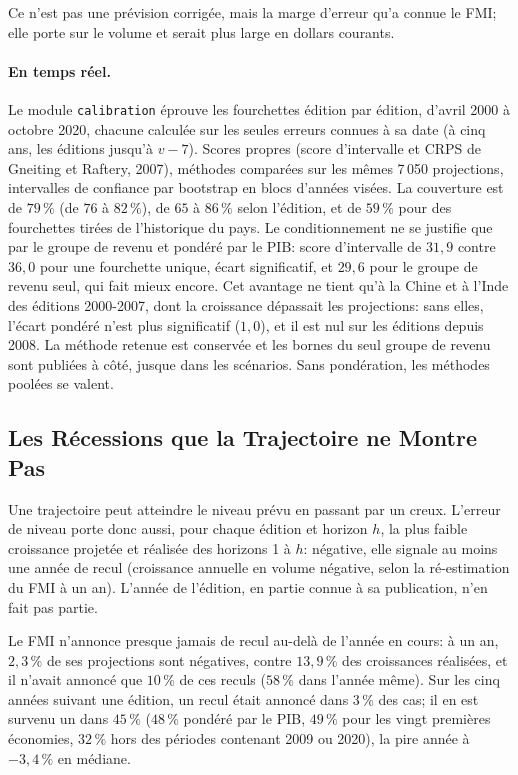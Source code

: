 \documentclass[11pt,a4paper]{article}
\begin{document}
Ce n'est pas une prévision corrigée, mais la marge d'erreur qu'a connue le FMI; elle porte sur le volume et serait plus large en dollars courants.

\paragraph{En temps réel.} Le module \texttt{calibration} éprouve les fourchettes édition par édition, d'avril 2000 à octobre 2020, chacune calculée sur les seules erreurs connues à sa date (à cinq ans, les éditions jusqu'à $v - 7$). Scores propres (score d'intervalle et CRPS de Gneiting et Raftery, 2007), méthodes comparées sur les mêmes 7\,050 projections, intervalles de confiance par bootstrap en blocs d'années visées. La couverture est de $79\,\%$ (de $76$ à $82\,\%$), de $65$ à $86\,\%$ selon l'édition, et de $59\,\%$ pour des fourchettes tirées de l'historique du pays. Le conditionnement ne se justifie que par le groupe de revenu et pondéré par le PIB: score d'intervalle de $31{,}9$ contre $36{,}0$ pour une fourchette unique, écart significatif, et $29{,}6$ pour le groupe de revenu seul, qui fait mieux encore. Cet avantage ne tient qu'à la Chine et à l'Inde des éditions 2000-2007, dont la croissance dépassait les projections: sans elles, l'écart pondéré n'est plus significatif ($1{,}0$), et il est nul sur les éditions depuis 2008. La méthode retenue est conservée et les bornes du seul groupe de revenu sont publiées à côté, jusque dans les scénarios. Sans pondération, les méthodes poolées se valent.

\subsection{Les Récessions que la Trajectoire ne Montre Pas}
Une trajectoire peut atteindre le niveau prévu en passant par un creux. L'erreur de niveau porte donc aussi, pour chaque édition et horizon $h$, la plus faible croissance projetée et réalisée des horizons 1 à $h$: négative, elle signale au moins une année de recul (croissance annuelle en volume négative, selon la ré-estimation du FMI à un an). L'année de l'édition, en partie connue à sa publication, n'en fait pas partie.

Le FMI n'annonce presque jamais de recul au-delà de l'année en cours: à un an, $2{,}3\,\%$ de ses projections sont négatives, contre $13{,}9\,\%$ des croissances réalisées, et il n'avait annoncé que $10\,\%$ de ces reculs ($58\,\%$ dans l'année même). Sur les cinq années suivant une édition, un recul était annoncé dans $3\,\%$ des cas; il en est survenu un dans $45\,\%$ ($48\,\%$ pondéré par le PIB, $49\,\%$ pour les vingt premières économies, $32\,\%$ hors des périodes contenant 2009 ou 2020), la pire année à $-3{,}4\,\%$ en médiane.
\end{document}
